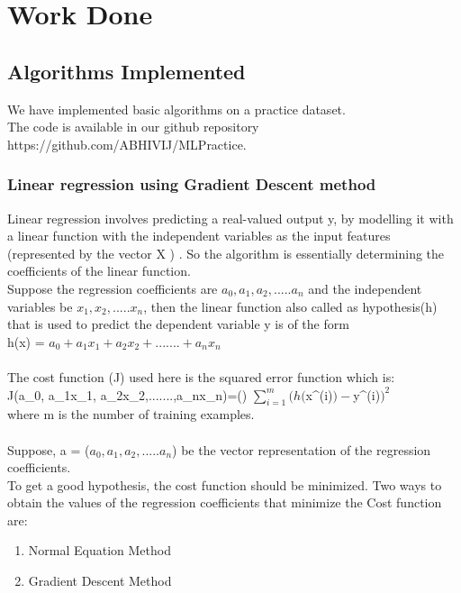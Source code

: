 \documentclass[10pt]{article}
\begin{document}
\section{Work Done}
\subsection{Algorithms Implemented}
We have implemented basic algorithms on a practice dataset. \\The code is available in our github repository https://github.com/ABHIVIJ/MLPractice.

\subsubsection{Linear regression using Gradient Descent method}

Linear regression involves predicting a real-valued output y, by modelling it with a linear function with the independent variables as the input features (represented by the vector X ) . So the algorithm is essentially determining the coefficients of the linear function.\\

Suppose the regression coefficients are $a_0,a_1,a_2,.....a_n$ and the independent variables be $x_1,x_2,.....x_n$, then the linear function also called as hypothesis(h) that is used to predict the dependent variable y is of the form\\

h(x) = $a_0+a_1x_1+a_2x_2+.......+a_nx_n$\\\\
The cost function (J) used here is the squared error function which is:\\

J(a_0, a_1x_1, a_2x_2,.......,a_nx_n)=() $\sum\limits_{i=1}^m (h($x^{(i)}$)-$y^{(i)}$)^2$
\\where m is the number of training examples.\\
\\Suppose, a = ($a_0,a_1,a_2,.....a_n$) be the vector representation of the regression coefficients.
\\To get a good hypothesis, the cost function should be minimized. Two ways to obtain the values of the regression coefficients that minimize the Cost function are: \\

\begin{enumerate}
	\item Normal Equation Method
	\item Gradient Descent Method
\end{enumerate}
\end{document}
